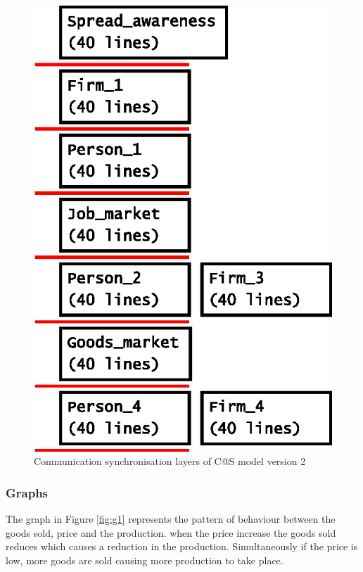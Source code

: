 \documentclass[a4paper,11pt]{article}
\begin{document}
\begin{figure}
\begin{center}
\includegraphics*[scale=1.0]{cats_v2_com_layers.eps}
\caption{Communication synchronisation layers of C@S model version 2} \label{fig:casff}
\end{center}
\end{figure}

\subsubsection{Graphs}

The graph in Figure \ref{fig:g1} represents the pattern of behaviour between the
goods sold, price and the production. when the price increase the
goods sold reduces which causes a reduction in the production.
Simultaneously if the price is low, more goods are sold causing more
production to take place.
\end{document}
